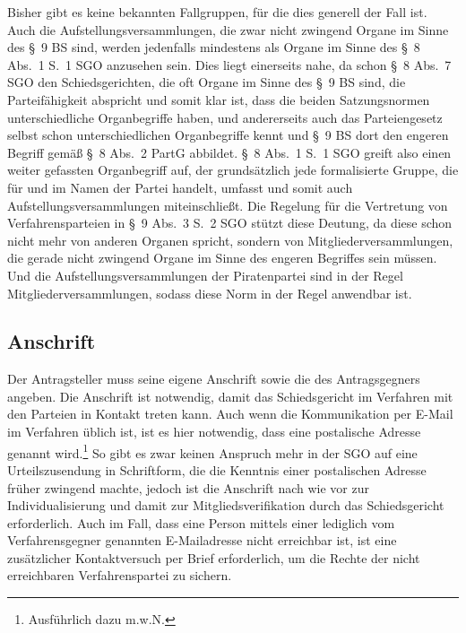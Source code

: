 Bisher gibt es keine bekannten Fallgruppen, für die dies generell der Fall ist.
Auch die Aufstellungsversammlungen, die zwar nicht zwingend Organe im Sinne des \S~9 BS sind, werden jedenfalls mindestens als Organe im Sinne des \S~8 Abs.~1 S.~1 SGO anzusehen sein.
Dies liegt einerseits nahe, da schon \S~8 Abs.~7 SGO den Schiedsgerichten, die oft Organe im Sinne des \S~9 BS sind, die Parteifähigkeit abspricht und somit klar ist, dass die beiden Satzungsnormen unterschiedliche Organbegriffe haben, und andererseits auch das Parteiengesetz selbst schon unterschiedlichen Organbegriffe kennt und \S~9 BS dort den engeren Begriff gemäß \S~8 Abs.~2 PartG abbildet.
\S~8 Abs.~1 S.~1 SGO greift also einen weiter gefassten Organbegriff auf, der grundsätzlich jede formalisierte Gruppe, die für und im Namen der Partei handelt, umfasst und somit auch Aufstellungsversammlungen miteinschließt.
Die Regelung für die Vertretung von Verfahrensparteien in \S~9 Abs.~3 S.~2 SGO stützt diese Deutung, da diese schon nicht mehr von anderen Organen spricht, sondern von Mitgliederversammlungen, die gerade nicht zwingend Organe im Sinne des engeren Begriffes sein müssen.
Und die Aufstellungsversammlungen der Piratenpartei sind in der Regel Mitgliederversammlungen, sodass diese Norm in der Regel anwendbar ist.

\subsection{Anschrift}
\label{Anrufung:Statthaftigkeit:Anschrift}
Der Antragsteller muss seine eigene Anschrift sowie die des Antragsgegners angeben.
Die Anschrift ist notwendig, damit das Schiedsgericht im Verfahren mit den Parteien in Kontakt treten kann.
Auch wenn die Kommunikation per E-Mail im Verfahren üblich ist, ist es hier notwendig, dass eine postalische Adresse genannt wird.\footnote{Ausführlich dazu \cite[S. 3]{BSG20130715} m.w.N.}
So gibt es zwar keinen Anspruch mehr in der SGO auf eine Urteilszusendung in Schriftform, die die Kenntnis einer postalischen Adresse früher zwingend machte, jedoch ist die Anschrift nach wie vor zur Individualisierung und damit zur Mitgliedsverifikation durch das Schiedsgericht erforderlich. Auch im Fall, dass eine Person mittels einer lediglich vom Verfahrensgegner genannten E-Mailadresse nicht erreichbar ist, ist eine zusätzlicher Kontaktversuch per Brief erforderlich, um die Rechte der nicht erreichbaren Verfahrenspartei zu sichern.

